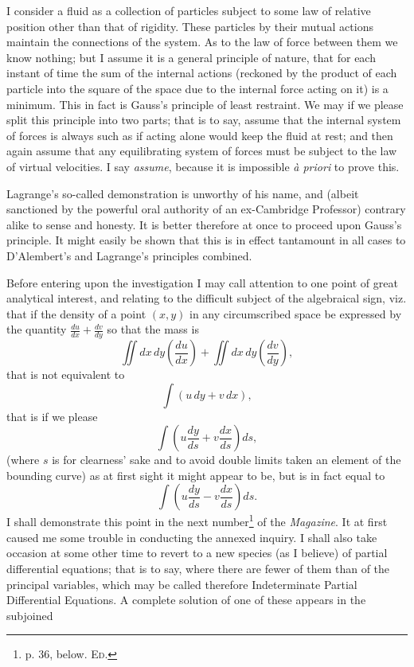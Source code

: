\documentclass[11pt]{article}
\newcommand{\sourcepage}[1]{\marginpar{\scriptsize p.~#1}}
\begin{document}
I consider a fluid as a collection of particles subject to some law of relative position other than that of rigidity. These particles by their mutual actions maintain the connections of the system. As to the law of force between them we know nothing; but I assume it is a general principle of nature, that for each instant of time the sum of the internal actions (reckoned by the product of each particle into the square of the space due to the internal force acting on it) is a minimum. This in fact is Gauss's principle of least restraint. We may if we please split this principle into two parts; that is to say, assume that the internal system of forces is always such as if acting alone would keep the fluid at rest; and then again assume that any equilibrating system of forces must be subject to the law of virtual velocities. I say \emph{assume}, because it is impossible \emph{à priori} to prove this.

Lagrange's so-called demonstration is unworthy of his name, and (albeit sanctioned by the powerful oral authority of an ex-Cambridge Professor) contrary alike to sense and honesty. It is better therefore at once to proceed upon Gauss's principle. It might easily be shown that this is in effect tantamount in all cases to D'Alembert's and Lagrange's principles combined.

Before entering upon the investigation I may call attention to one point of great analytical interest, and relating to the difficult subject of the algebraical sign, viz. that if the density of a point $(x,y)$ in any circumscribed space be expressed by the quantity $\frac{du}{dx}+\frac{dv}{dy}$ so that the mass is
\[
\iint dx\,dy\left(\frac{du}{dx}\right)+\iint dx\,dy\left(\frac{dv}{dy}\right),
\]
\sourcepage{29}
that is not equivalent to
\[
\int (u\,dy+v\,dx),
\]
that is if we please
\[
\int\left(u\frac{dy}{ds}+v\frac{dx}{ds}\right)ds,
\]
(where $s$ is for clearness' sake and to avoid double limits taken an element of the bounding curve) as at first sight it might appear to be, but is in fact equal to
\[
\int\left(u\frac{dy}{ds}-v\frac{dx}{ds}\right)ds.
\]
I shall demonstrate this point in the next number\footnote{p. 36, below. \textsc{Ed.}} of the \emph{Magazine}. It at first caused me some trouble in conducting the annexed inquiry. I shall also take occasion at some other time to revert to a new species (as I believe) of partial differential equations; that is to say, where there are fewer of them than of the principal variables, which may be called therefore Indeterminate Partial Differential Equations. A complete solution of one of these appears in the subjoined
\end{document}
